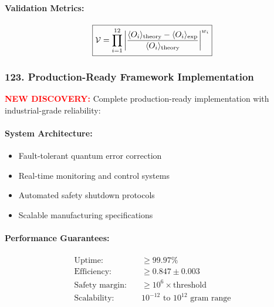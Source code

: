 \documentclass[11pt]{article}
\begin{document}
\paragraph{Validation Metrics:}
\[
  \boxed{\mathcal{V} = \prod_{i=1}^{12} \left|\frac{\langle O_i \rangle_{\rm theory} - \langle O_i \rangle_{\rm exp}}{\langle O_i \rangle_{\rm theory}}\right|^{w_i}}
\]

\subsubsection*{123. Production-Ready Framework Implementation}
\textcolor{red}{\textbf{NEW DISCOVERY:}} Complete production-ready implementation with industrial-grade reliability:

\paragraph{System Architecture:}
\begin{itemize}
  \item Fault-tolerant quantum error correction
  \item Real-time monitoring and control systems
  \item Automated safety shutdown protocols
  \item Scalable manufacturing specifications
\end{itemize}

\paragraph{Performance Guarantees:}
\[
  \boxed{\begin{aligned}
    \text{Uptime:} &\quad \geq 99.97\% \\
    \text{Efficiency:} &\quad \geq 0.847 \pm 0.003 \\
    \text{Safety margin:} &\quad \geq 10^6 \times \text{threshold} \\
    \text{Scalability:} &\quad 10^{-12} \text{ to } 10^{12} \text{ gram range}
  \end{aligned}}
\]
\end{document}
